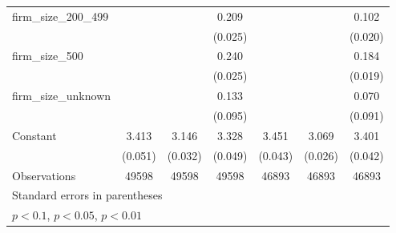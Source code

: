 {\begin{tabular}{l*{6}{c}}
firm\_size\_200\_499   &                     &                     &       0.209\sym{***}&                     &                     &       0.102\sym{***}\\
                    &                     &                     &     (0.025)         &                     &                     &     (0.020)         \\
firm\_size\_500       &                     &                     &       0.240\sym{***}&                     &                     &       0.184\sym{***}\\
                    &                     &                     &     (0.025)         &                     &                     &     (0.019)         \\
firm\_size\_unknown   &                     &                     &       0.133         &                     &                     &       0.070         \\
                    &                     &                     &     (0.095)         &                     &                     &     (0.091)         \\
Constant            &       3.413\sym{***}&       3.146\sym{***}&       3.328\sym{***}&       3.451\sym{***}&       3.069\sym{***}&       3.401\sym{***}\\
                    &     (0.051)         &     (0.032)         &     (0.049)         &     (0.043)         &     (0.026)         &     (0.042)         \\
\hline
Observations        &       49598         &       49598         &       49598         &       46893         &       46893         &       46893         \\
\hline\hline
\multicolumn{7}{l}{\footnotesize Standard errors in parentheses}\\
\multicolumn{7}{l}{\footnotesize \sym{*} \(p<0.1\), \sym{**} \(p<0.05\), \sym{***} \(p<0.01\)}\\
\end{tabular}
}
